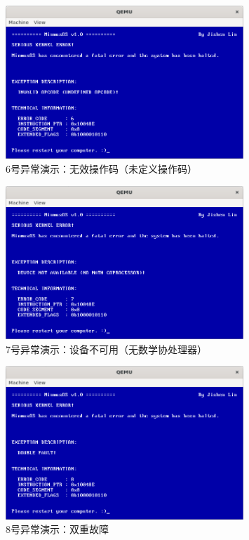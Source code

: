 \begin{figure}[htbp]
    \centering
    \includegraphics[width=0.8\textwidth]{figures/Exception6Presentation.png}
    \caption{6号异常演示：无效操作码（未定义操作码）}
\end{figure}

\begin{figure}[htbp]
    \centering
    \includegraphics[width=0.8\textwidth]{figures/Exception7Presentation.png}
    \caption{7号异常演示：设备不可用（无数学协处理器）}
\end{figure}

\begin{figure}[htbp]
    \centering
    \includegraphics[width=0.8\textwidth]{figures/Exception8Presentation.png}
    \caption{8号异常演示：双重故障}
\end{figure}

